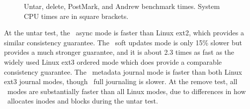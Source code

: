 \begin{figure*}[t]
\caption{\label{fig:bench_time} Untar, delete, PostMark, and Andrew
  benchmark times. System CPU times are in square brackets.}
\end{figure*}

At the untar test, the \Kudos\ async mode is faster than Linux ext2, which
provides a similar consistency guarantee. The \Kudos\ soft updates mode is
only 15\% slower but provides a much stronger guarantee, and it is about 2.3
times as fast as the widely used Linux ext3 ordered mode which does provide a
comparable consistency guarantee. The \Kudos\ metadata journal mode is faster
than both Linux ext3 journal modes, though \Kudos\ full journaling is slower.
At the remove test, all \Kudos\ modes are substantially faster than all Linux
modes, due to differences in how \Kudos\ allocates inodes and blocks during
the untar test.


